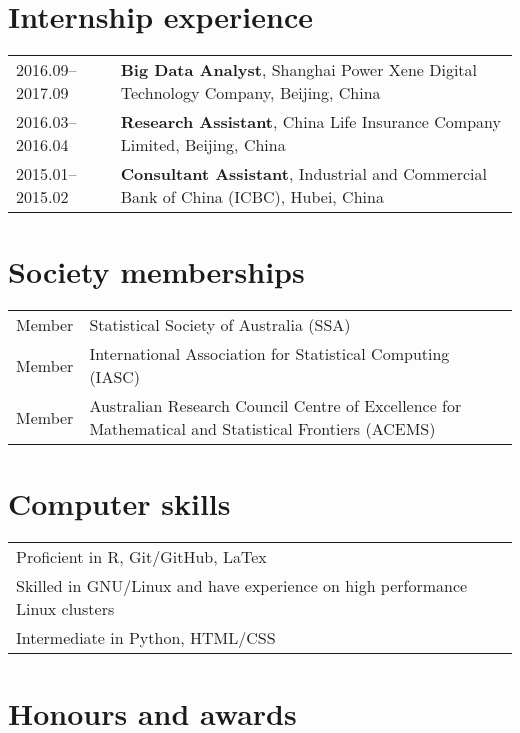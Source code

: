 \documentclass[10pt,a4paper,]{article}
\begin{document}
\hypertarget{internship-experience}{%
\section{Internship experience}\label{internship-experience}}

\begin{tabular}{ll}
  2016.09--2017.09 & \textbf{Big Data Analyst}, Shanghai Power Xene Digital Technology Company, Beijing, China \\ 
  2016.03--2016.04 & \textbf{Research Assistant}, China Life Insurance Company Limited, Beijing, China \\ 
  2015.01--2015.02 & \textbf{Consultant Assistant}, Industrial and Commercial Bank of China (ICBC), Hubei, China \\ 
  \end{tabular}

\hypertarget{society-memberships}{%
\section{Society memberships}\label{society-memberships}}

\begin{tabular}{ll}
  Member & Statistical Society of Australia (SSA) \\ 
  Member & International Association for Statistical Computing (IASC) \\ 
  Member & Australian Research Council Centre of Excellence for Mathematical and Statistical Frontiers (ACEMS) \\ 
  \end{tabular}

\hypertarget{computer-skills}{%
\section{Computer skills}\label{computer-skills}}

\begin{tabular}{l}
  Proficient in R, Git/GitHub, LaTex \\ 
  Skilled in GNU/Linux and have experience on high performance Linux clusters \\ 
  Intermediate in Python, HTML/CSS \\ 
  \end{tabular}

\hypertarget{honours-and-awards}{%
\section{Honours and awards}\label{honours-and-awards}}
\end{document}
